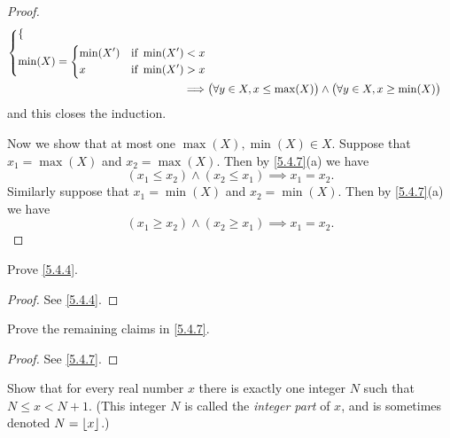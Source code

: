 \begin{proof}
\begin{align*}
\begin{dcases}
\begin{dcases}
                \end{dcases} \\
                 \min(X) = \begin{dcases}
                  \min(X') & \text{if } \min(X') < x \\
                  x        & \text{if } \min(X') > x
                \end{dcases}
               \end{dcases}                                                                                                            \\
    \implies & \big(\forall y \in X, x \leq \max(X)\big) \land \big(\forall y \in X, x \geq \min(X)\big)
  \end{align*}
  and this closes the induction.

  Now we show that at most one \(\max(X), \min(X) \in X\).
  Suppose that \(x_1 = \max(X)\) and \(x_2 = \max(X)\).
  Then by \cref{5.4.7}(a) we have
  \[
    (x_1 \leq x_2) \land (x_2 \leq x_1) \implies x_1 = x_2.
  \]
  Similarly suppose that \(x_1 = \min(X)\) and \(x_2 = \min(X)\).
  Then by \cref{5.4.7}(a) we have
  \[
    (x_1 \geq x_2) \land (x_2 \geq x_1) \implies x_1 = x_2.
  \]
\end{proof}

\exercisesection

\begin{ex}\label{ex:5.4.1}
  Prove \cref{5.4.4}.
\end{ex}

\begin{proof}
  See \cref{5.4.4}.
\end{proof}

\begin{ex}\label{ex:5.4.2}
  Prove the remaining claims in \cref{5.4.7}.
\end{ex}

\begin{proof}
  See \cref{5.4.7}.
\end{proof}

\begin{ex}\label{ex:5.4.3}
  Show that for every real number \(x\) there is exactly one integer \(N\) such that \(N \leq x < N + 1\).
  (This integer \(N\) is called the \emph{integer part} of \(x\), and is sometimes denoted \(N = \left\lfloor x\right\rfloor\).)
\end{ex}

